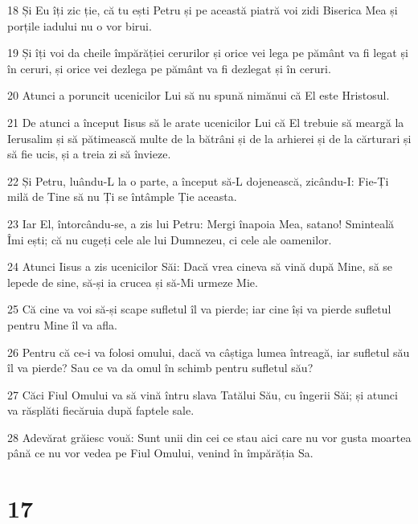 \par 18 Și Eu îți zic ție, că tu ești Petru și pe această piatră voi zidi Biserica Mea și porțile iadului nu o vor birui.
\par 19 Și îți voi da cheile împărăției cerurilor și orice vei lega pe pământ va fi legat și în ceruri, și orice vei dezlega pe pământ va fi dezlegat și în ceruri.
\par 20 Atunci a poruncit ucenicilor Lui să nu spună nimănui că El este Hristosul.
\par 21 De atunci a început Iisus să le arate ucenicilor Lui că El trebuie să meargă la Ierusalim și să pătimească multe de la bătrâni și de la arhierei și de la cărturari și să fie ucis, și a treia zi să învieze.
\par 22 Și Petru, luându-L la o parte, a început să-L dojenească, zicându-I: Fie-Ți milă de Tine să nu Ți se întâmple Ție aceasta.
\par 23 Iar El, întorcându-se, a zis lui Petru: Mergi înapoia Mea, satano! Sminteală Îmi ești; că nu cugeți cele ale lui Dumnezeu, ci cele ale oamenilor.
\par 24 Atunci Iisus a zis ucenicilor Săi: Dacă vrea cineva să vină după Mine, să se lepede de sine, să-și ia crucea și să-Mi urmeze Mie.
\par 25 Că cine va voi să-și scape sufletul îl va pierde; iar cine își va pierde sufletul pentru Mine îl va afla.
\par 26 Pentru că ce-i va folosi omului, dacă va câștiga lumea întreagă, iar sufletul său îl va pierde? Sau ce va da omul în schimb pentru sufletul său?
\par 27 Căci Fiul Omului va să vină întru slava Tatălui Său, cu îngerii Săi; și atunci va răsplăti fiecăruia după faptele sale.
\par 28 Adevărat grăiesc vouă: Sunt unii din cei ce stau aici care nu vor gusta moartea până ce nu vor vedea pe Fiul Omului, venind în împărăția Sa.

\chapter{17}


